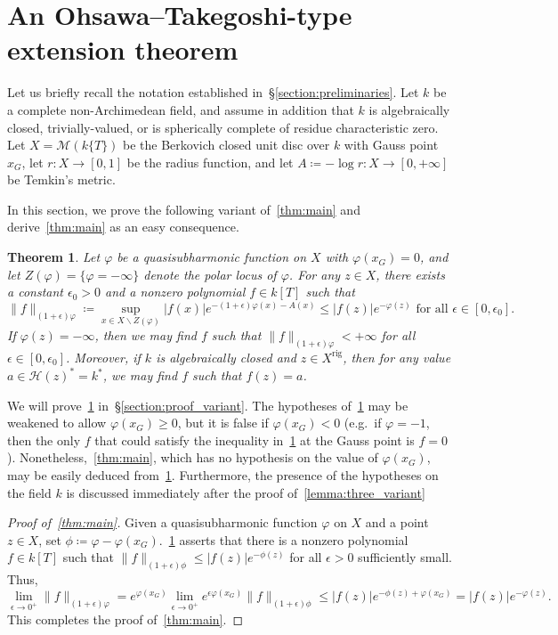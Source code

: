 \documentclass[10pt,reqno]{amsart}
\theoremstyle{plain}
\newtheorem{theorem}{Theorem}[section]
\theoremstyle{definition}
\renewcommand{\H}{\mathcal{H}}
\numberwithin{equation}{section}
\newcommand{\M}{\mathcal{M}}
\DeclareMathOperator{\rig}{rig}
\begin{document}
\section{An Ohsawa--Takegoshi-type extension theorem}\label{section:ot}

Let us briefly recall the notation established in~\S\ref{section:preliminaries}. Let $k$ be a complete non-Archimedean field, and assume in addition that $k$ is algebraically closed, trivially-valued, or is spherically complete of residue characteristic zero.
Let $X = \M(k\{ T \})$ be the Berkovich closed unit disc over $k$ with Gauss point $x_G$, let $r \colon X \to [0,1]$ be the radius function, and let $A \coloneqq -\log r \colon X \to [0,+\infty]$ be Temkin's metric.

In this section, we prove the following variant of~\cref{thm:main} and derive~\cref{thm:main} as an easy consequence.

\begin{theorem}\label{thm:otvariant}
Let $\varphi$ be a quasisubharmonic function on $X$ with $\varphi(x_G) = 0$, and let $Z(\varphi) = \{ \varphi = -\infty \}$ denote the polar locus of $\varphi$. For any $z \in X$, there exists a constant $\epsilon_0 > 0$ and a nonzero polynomial $f \in k[T]$ such that
$$
\| f \|_{(1+\epsilon)\varphi} \coloneqq \sup_{x \in X \backslash Z(\varphi)} |f(x)|e^{-(1+\epsilon)\varphi(x) - A(x)} \leq |f(z)|e^{-\varphi(z)} \textrm{ for all $\epsilon \in [0,\epsilon_0]$.}
$$
If $\varphi(z) = -\infty$, then we may find $f$ such that $\| f \|_{(1+\epsilon)\varphi} < +\infty$ for all $\epsilon \in [0,\epsilon_0]$. Moreover, if $k$ is algebraically closed and $z \in X^{\rig}$, then for any value $a \in \H(z)^* = k^*$, we may find $f$ such that $f(z) = a$. 
\end{theorem}

We will prove~\cref{thm:otvariant} in~\S\ref{section:proof_variant}. 
The hypotheses of~\cref{thm:otvariant} may be weakened to allow $\varphi(x_G) \geq 0$, but it is false if $\varphi(x_G) < 0$ (e.g.\ if $\varphi = -1$, then the only $f$ that could satisfy the inequality in~\cref{thm:otvariant} at the Gauss point is $f = 0$).
Nonetheless,~\cref{thm:main}, which has no hypothesis on the value of $\varphi(x_G)$, may be easily deduced from~\cref{thm:otvariant}.
Furthermore, the presence of the hypotheses on the field $k$ is discussed immediately after the proof of~\cref{lemma:three_variant}

\begin{proof}[Proof of~\cref{thm:main}]
Given a quasisubharmonic function $\varphi$ on $X$ and a point $z \in X$, set $\phi \coloneqq \varphi - \varphi(x_G)$.~\cref{thm:otvariant} asserts that there is a nonzero polynomial $f \in k[T]$ such that $\| f \|_{(1+\epsilon)\phi } \leq |f(z)| e^{-\phi(z)}$ for all $\epsilon > 0$ sufficiently small. Thus,
$$
\lim_{\epsilon \to 0^+} \| f \|_{(1+\epsilon)\varphi } = e^{\varphi(x_G)} \lim_{\epsilon \to 0^+} e^{\epsilon \varphi(x_G)} \| f \|_{(1+\epsilon)\phi } \leq |f(z)| e^{-\phi(z) + \varphi(x_G)} = |f(z)|e^{-\varphi(z)}.
$$
This completes the proof of~\cref{thm:main}.
\end{proof}
\end{document}
